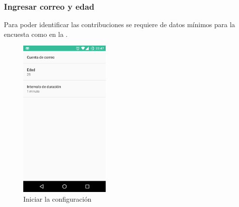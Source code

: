 {\subsubsection{Ingresar correo y edad}
\label{config:ingresa-tu-correo-y-edad}
Para poder identificar las contribuciones se requiere de datos mínimos para la encuesta como en la .
\begin{figure}[!h]
\centering
    \includegraphics[width=0.4\textwidth]{anexos/graphics/app_conf.jpg}
\caption{Iniciar la configuración}\label{config:id2}\end{figure}

}
